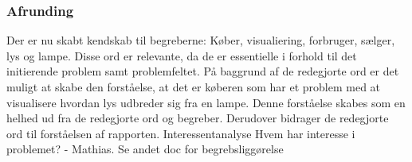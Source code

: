 
\subsubsection{Afrunding}
Der er nu skabt kendskab til begreberne: Køber, visualiering, forbruger, sælger,  lys og lampe. Disse ord er relevante, da de er essentielle i forhold til det initierende problem samt problemfeltet. På baggrund af de redegjorte ord er det muligt at skabe den forståelse, at det er køberen som har et problem med at visualisere hvordan lys udbreder sig fra en lampe. Denne forståelse skabes som en helhed ud fra de redegjorte ord og begreber. 
Derudover bidrager de redegjorte ord til forståelsen af rapporten.
Interessentanalyse
Hvem har interesse i problemet? - Mathias. Se andet doc for begrebsliggørelse
 


